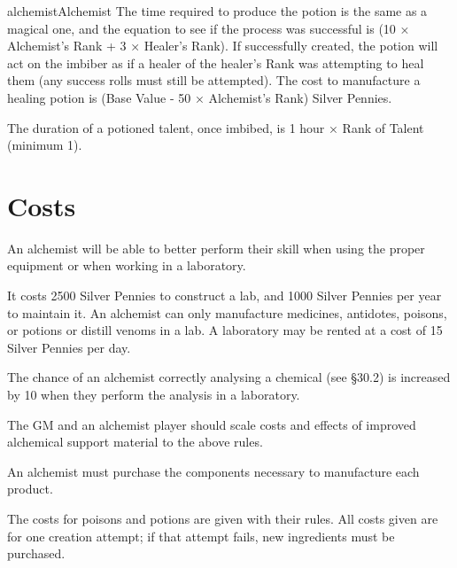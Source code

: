 \begin{Skill}[1.1]{alchemist}{Alchemist}
The time required to produce the potion is the same as a magical one,
and the equation to see if the process was successful is (10 ×
Alchemist’s Rank + 3 × Healer’s Rank).  If successfully created, the
potion will act on the imbiber as if a healer of the healer’s Rank was
attempting to heal them (any success rolls must still be attempted).
The cost to manufacture a healing potion is (Base Value - 50 ×
Alchemist’s Rank) Silver Pennies.

The duration of a potioned talent, once imbibed, is 1 hour × Rank of
Talent (minimum 1).

\section{Costs}

An alchemist will be able to better perform their skill when using the
proper equipment or when working in a laboratory.

It costs 2500 Silver Pennies to construct a lab, and 1000 Silver
Pennies per year to maintain it.  An alchemist can only manufacture
medicines, antidotes, poisons, or potions or distill venoms in a lab.
A laboratory may be rented at a cost of 15 Silver Pennies per day.

The chance of an alchemist correctly analysing a chemical (see §30.2)
is increased by 10 when they perform the analysis in a laboratory.

The GM and an alchemist player should scale costs and effects of
improved alchemical support material to the above rules.

An alchemist must purchase the components necessary to manufacture
each product.

The costs for poisons and potions are given with their rules.  All
costs given are for one creation attempt; if that attempt fails, new
ingredients must be purchased.

\end{Skill}
